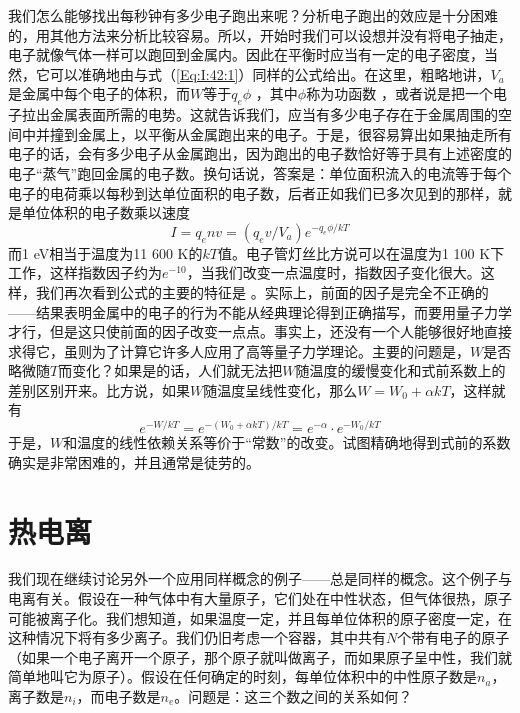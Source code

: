 我们怎么能够找出每秒钟有多少电子跑出来呢？分析电子跑出的效应是十分困难的，用其他方法来分析比较容易。所以，开始时我们可以设想并没有将电子抽走，电子就像气体一样可以跑回到金属内。因此在平衡时应当有一定的电子密度，当然，它可以准确地由与式（\ref{Eq:I:42:1}）同样的公式给出。在这里，粗略地讲，$V_a$是金属中每个电子的体积，而$W$等于$q_e \phi$ ，其中$\phi$称为功函数 ，或者说是把一个电子拉出金属表面所需的电势。这就告诉我们，应当有多少电子存在于金属周围的空间中并撞到金属上，以平衡从金属跑出来的电子。于是，很容易算出如果抽走所有电子的话，会有多少电子从金属跑出，因为跑出的电子数恰好等于具有上述密度的电子“蒸气”跑回金属的电子数。换句话说，答案是：单位面积流入的电流等于每个电子的电荷乘以每秒到达单位面积的电子数，后者正如我们已多次见到的那样，就是单位体积的电子数乘以速度
\begin{equation}
    \label{Eq:I:42:6}
    I=q_env=(q_ev/V_a)e^{-q_e\phi/kT}
\end{equation}
而1 eV相当于温度为11 600 K的$kT$值。电子管灯丝比方说可以在温度为1 100 K下工作，这样指数因子约为$e^{-10}$，当我们改变一点温度时，指数因子变化很大。这样，我们再次看到公式的主要的特征是 。实际上，前面的因子是完全不正确的——结果表明金属中的电子的行为不能从经典理论得到正确描写，而要用量子力学才行，但是这只使前面的因子改变一点点。事实上，还没有一个人能够很好地直接求得它，虽则为了计算它许多人应用了高等量子力学理论。主要的问题是，$W$是否略微随$T$而变化？如果是的话，人们就无法把$W$随温度的缓慢变化和式前系数上的差别区别开来。比方说，如果$W$随温度呈线性变化，那么$W=W_0+\alpha kT$，这样就有
\begin{equation*}
    e^{-W/kT} = e^{-(W_0+\alpha kT)/kT} = e^{-\alpha}\cdot e^{-W_0/kT}
\end{equation*}
于是，$W$和温度的线性依赖关系等价于“常数”的改变。试图精确地得到式前的系数确实是非常困难的，并且通常是徒劳的。

\section{热电离}

我们现在继续讨论另外一个应用同样概念的例子——总是同样的概念。这个例子与电离有关。假设在一种气体中有大量原子，它们处在中性状态，但气体很热，原子可能被离子化。我们想知道，如果温度一定，并且每单位体积的原子密度一定，在这种情况下将有多少离子。我们仍旧考虑一个容器，其中共有$N$个带有电子的原子（如果一个电子离开一个原子，那个原子就叫做离子，而如果原子呈中性，我们就简单地叫它为原子）。假设在任何确定的时刻，每单位体积中的中性原子数是$n_a$，离子数是$n_i$，而电子数是$n_e$。问题是：这三个数之间的关系如何？

